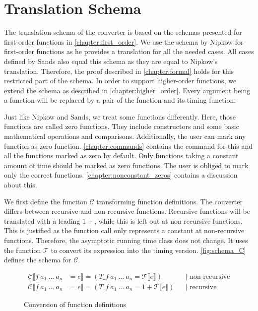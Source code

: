 
\section{Translation Schema} \label{chapter:impl_schema}

The translation schema of the converter is based on the schemas presented for first-order functions in \autoref{chapter:first_order}.
We use the schema by Nipkow \parencite{fds} for first-order functions as he provides a translation for all the needed cases.
All cases defined by Sands also equal this schema \parencite{sands} as they are equal to Nipkow's translation.
Therefore, the proof described in \autoref{chapter:formal} holds for this restricted part of the schema.
In order to support higher-order functions, we extend the schema as described in \autoref{chapter:higher_order}.
Every argument being a function will be replaced by a pair of the function and its timing function.

Just like Nipkow and Sands, we treat some functions differently.
Here, those functions are called zero functions.
They include constructors and some basic mathematical operations and comparisons.
Additionally, the user can mark any function as zero function.
\autoref{chapter:commands} contains the command for this and all the functions marked as zero by default.
Only functions taking a constant amount of time should be marked as zero functions.
The user is obliged to mark only the correct functions.
\autoref{chapter:nonconstant_zeros} contains a discussion about this.

We first define the function $\mathcal{C}$ transforming function definitions.
The converter differs between recursive and non-recursive functions.
Recursive functions will be translated with a leading $1+$, while this is left out at non-recursive functions.
This is justified as the function call only represents a constant at non-recursive functions.
Therefore, the asymptotic running time class does not change.
It uses the function $\mathcal{T}$ to convert its expression into the timing version.
\autoref{fig:schema_C} defines the schema for $\mathcal{C}$.
\begin{figure}
  \begin{align*}
    \mathcal{C}\llbracket f\ a_1\ \dots\ a_n &= e\rrbracket = (T\_f\ a_{1}\ \dots\ a_{n} = \mathcal{T}\llbracket e\rrbracket) &&\text{| non-recursive}\\
    \mathcal{C}\llbracket f\ a_1\ \dots\ a_n &= e\rrbracket = (T\_f\ a_{1}\ \dots\ a_{n} = 1 + \mathcal{T}\llbracket e\rrbracket) &&\text{| recursive}
  \end{align*}
  \caption{Conversion of function definitions}
  \label{fig:schema_C}
\end{figure}

